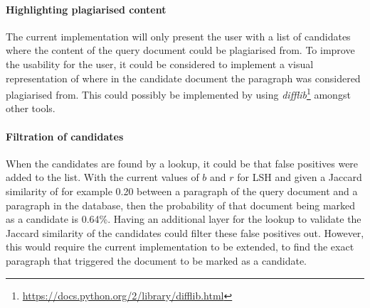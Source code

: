 \paragraph{Highlighting plagiarised content}
The current implementation will only present the user with a list of candidates where the content of the query document could be plagiarised from. To improve the usability for the user, it could be considered to implement a visual representation of where in the candidate document the paragraph was considered plagiarised from. This could possibly be implemented by using \emph{difflib}\footnote{\url{https://docs.python.org/2/library/difflib.html}} amongst other tools.

\paragraph{Filtration of candidates}
When the candidates are found by a lookup, it could be that false positives were added to the list. With the current values of $b$ and $r$ for LSH and given a Jaccard similarity of for example 0.20 between a paragraph of the query document and a paragraph in the database, then the probability of that document being marked as a candidate is 0.64\%. Having an additional layer for the lookup to validate the Jaccard similarity of the candidates could filter these false positives out. However, this would require the current implementation to be extended, to find the exact paragraph that triggered the document to be marked as a candidate.